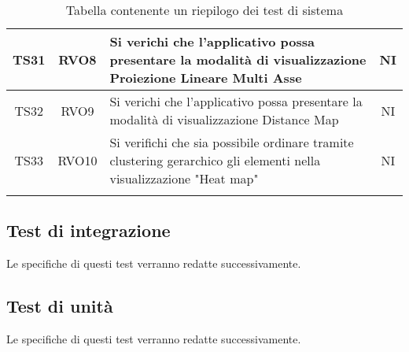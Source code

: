 \documentclass[../piano_di_qualifica.tex]{subfiles}
\begin{document}
\begin{center}
\begin{longtable}{|c|c|p{8.5cm}|c|}
		TS31              & RVO8                   & Si verichi che l’applicativo possa presentare la modalità di visualizzazione Proiezione Lineare Multi Asse             & NI                         \\ \hline
		TS32              & RVO9                   & Si verichi che l’applicativo possa presentare la modalità di visualizzazione Distance Map                              & NI                         \\ \hline
		TS33              & RVO10                  & Si verifichi che sia possibile ordinare tramite clustering gerarchico gli elementi nella visualizzazione "Heat map"    & NI                         \\ \hline
		\hline
		\rowcolor{white}
		\caption{Tabella contenente un riepilogo dei test di sistema}
	\end{longtable}

\end{center}


\subsection{Test di integrazione}%
\label{sub:test_int}
Le specifiche di questi test verranno redatte successivamente.

\subsection{Test di unità}%
\label{sub:test_unit}
Le specifiche di questi test verranno redatte successivamente.
\end{document}
